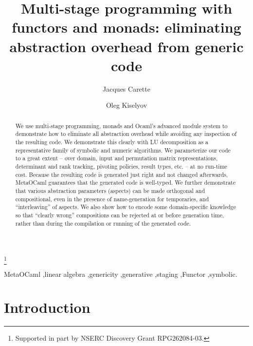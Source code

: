 \documentclass{elsart}
\begin{document}
\begin{frontmatter}
\title{Multi-stage programming with functors and monads:
eliminating abstraction overhead from generic code}
\author{Jacques Carette}
\address{McMaster University,
1280 Main St. West, Hamilton, Ontario Canada L8S 4K1}
\author{Oleg Kiselyov}
\address{FNMOC, Monterey, CA 93943}


\thanks[1]{Supported in part by NSERC Discovery Grant RPG262084-03.}

\begin{abstract}
We use multi-stage programming, monads and Ocaml's
advanced module system to demonstrate how to eliminate all
abstraction overhead while avoiding any inspection of the resulting
code.  We demonstrate this clearly with LU decomposition as a 
representative family of symbolic and numeric algorithms. 
We parameterize our code to a great extent --
over domain, input and permutation matrix representations, 
determinant and rank tracking, 
pivoting policies, result types, etc. -- at no run-time cost.  Because
the resulting code is generated just right and not changed afterwards,
MetaOCaml guarantees that the generated code is well-typed.
We further demonstrate that various abstraction parameters (aspects)
can be made orthogonal and compositional, even in the presence of
name-generation for temporaries, and 
``interleaving'' of aspects.  We also show how to encode some
domain-specific knowledge so that ``clearly wrong'' compositions can
be rejected at or before generation time, rather than during
the compilation or running of the generated code.
\end{abstract}

\begin{keyword}
MetaOCaml \sep linear algebra \sep genericity \sep generative \sep staging
\sep Functor \sep symbolic.
\end{keyword}
\end{frontmatter}

\section{Introduction}
\end{document}
